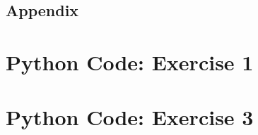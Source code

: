 \documentclass[letterpaper,12pt]{article}
\begin{document}
\pagebreak

\begin{center}
  \section*{Appendix}
\end{center}

\section*{Python Code: Exercise 1}



\pagebreak

\section*{Python Code: Exercise 3}



\pagebreak

\begin{thebibliography}{99}


\end{thebibliography}
\end{document}
